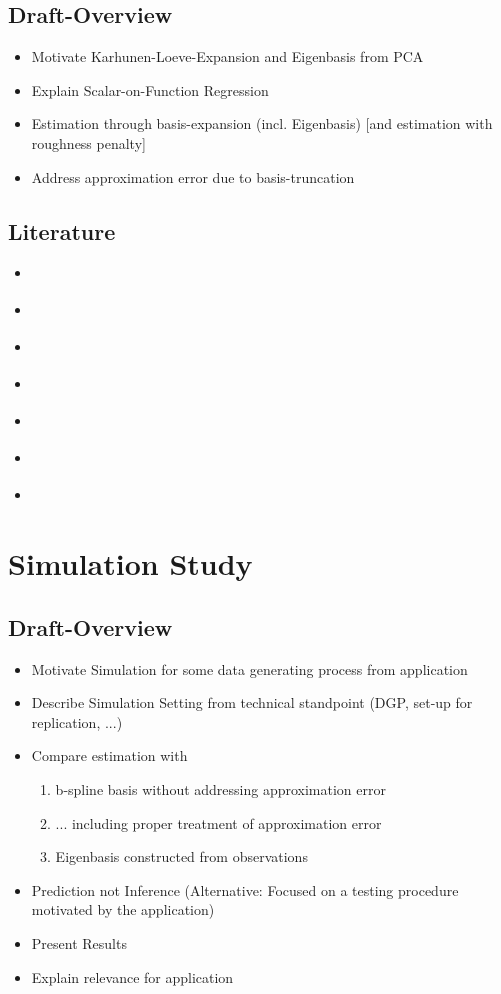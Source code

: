 \documentclass[11pt,twoside,a4paper]{article}
\begin{document}
	\subsection{Draft-Overview}
	\begin{itemize}
		\item Motivate Karhunen-Loeve-Expansion and Eigenbasis from PCA		
		\item Explain Scalar-on-Function Regression
		\item Estimation through basis-expansion (incl. Eigenbasis) [and estimation with roughness penalty]
		\item Address approximation error due to basis-truncation
	\end{itemize}

	\subsection{Literature}
	\begin{itemize}
		\item \cite{alexanderian_KLexpansion_2015}
		\item \cite{kokoszka_introduction_2017}
		\item \cite{hsing_theoretical_2015}
		\item \cite{ramsay_functional_2005}
		\item \cite{horvath_inference_2012}
		\item \cite{cai_prediction_2006}
		\item \cite{levitin_introduction_2007}
	\end{itemize}
	
	\newpage
	\section{Simulation Study}
	
	\subsection{Draft-Overview}
	\begin{itemize}
		\item Motivate Simulation for some data generating process from application
		\item Describe Simulation Setting from technical standpoint (DGP, set-up for replication, ...)
		
		\item Compare estimation with \begin{enumerate}
			\item b-spline basis without addressing approximation error
			\item ... including proper treatment of approximation error
			\item Eigenbasis constructed from observations
			\end{enumerate}
	
		\item Prediction not Inference (Alternative: Focused on a testing procedure motivated by the application)
		\item Present Results
		\item Explain relevance for application
	\end{itemize}
\end{document}
